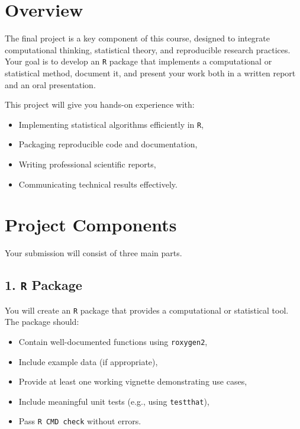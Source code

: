 \documentclass[
  letterpaper,
  DIV=11,
  numbers=noendperiod]{scrreprt}
\providecommand{\tightlist}{%
  \setlength{\itemsep}{0pt}\setlength{\parskip}{0pt}}
\begin{document}
\section{Overview}\label{overview-1}

The final project is a key component of this course, designed to
integrate computational thinking, statistical theory, and reproducible
research practices. Your goal is to develop an \texttt{R} package that
implements a computational or statistical method, document it, and
present your work both in a written report and an oral presentation.

This project will give you hands-on experience with:

\begin{itemize}
\tightlist
\item
  Implementing statistical algorithms efficiently in \texttt{R},
\item
  Packaging reproducible code and documentation,
\item
  Writing professional scientific reports,
\item
  Communicating technical results effectively.
\end{itemize}

\section{Project Components}\label{project-components}

Your submission will consist of three main parts.

\subsection{\texorpdfstring{1. \texttt{R}
Package}{1. R Package}}\label{r-package}

You will create an \texttt{R} package that provides a computational or
statistical tool. The package should:

\begin{itemize}
\tightlist
\item
  Contain well-documented functions using \texttt{roxygen2},
\item
  Include example data (if appropriate),
\item
  Provide at least one working vignette demonstrating use cases,
\item
  Include meaningful unit tests (e.g., using \texttt{testthat}),
\item
  Pass \texttt{R\ CMD\ check} without errors.
\end{itemize}
\end{document}
